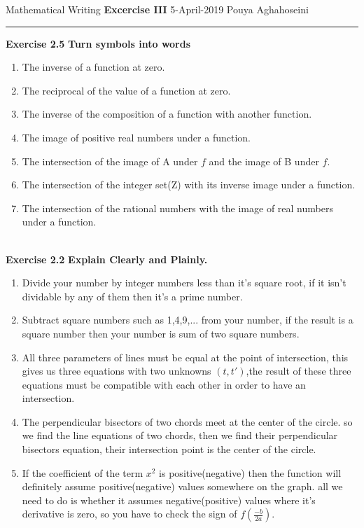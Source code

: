\documentclass{article}
\begin{document}
\noindent
Mathematical Writing \hfill \textbf{Excercise III} \newline 
{5-April-2019} \hfill Pouya Aghahoseini

\noindent
\rule{\linewidth}{0.4pt}
\textbf{\large\color{blue} Exercise 2.5}   \textbf{Turn symbols into words}
	\begin{enumerate}
		\item 
		The inverse of a function at zero.
		\item
		The reciprocal of the value of a function at zero.
		\item 
		The inverse of the composition of a function with another function.
		\item 
		The image of positive real numbers under a function.
		\item 
		The intersection of the image of A under $f$ and the image of B under $f$.
		\item 
		The intersection of the integer set(Z) with its inverse image under a function.
		\item 
		The intersection of the rational numbers with the image of real numbers under a function.
	\end{enumerate}
	
\text{}\\
\textbf{\large\color{blue} Exercise 2.2}   \textbf{Explain Clearly and Plainly.}
	\begin{enumerate}
		\item 
		Divide your number by integer numbers less than it's square root, if it isn't dividable by any of them then it's a prime number.
		\item 
		Subtract square numbers such as 1,4,9,... from your number, if the result is a square number then your number is sum of two square numbers.
		\item 
		All three parameters of lines must be equal at the point of intersection, this gives us three equations with two unknowns $(t,t')$,the result of these three equations must be compatible with each other in order to have an intersection.
		\item
		The perpendicular bisectors of two chords meet at the center of the circle. so we find the line equations of two chords, then we find their perpendicular bisectors equation, their intersection point is the center of the circle.
		\item 
		If the coefficient of the term $x^{2}$ is positive(negative) then the function will definitely assume positive(negative) values somewhere on the graph. all we need to do is whether it assumes negative(positive) values where it's derivative is zero, so you have to check the sign of $f(\frac{-b}{2a})$. 
	\end{enumerate}
\end{document}
